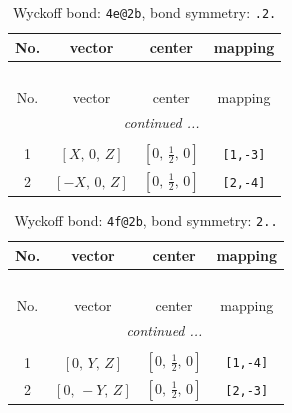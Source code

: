 \documentclass[fleqn,8pt]{jsarticle}
\begin{document}
\renewcommand{\arraystretch}{1.2}
\begin{longtable}{cccc}
\caption{Wyckoff bond: {\tt 4e@2b}, bond symmetry: {\tt .2.}}
 \\
 \hline \hline
No. & vector & center & mapping \\ \hline \endfirsthead

\multicolumn{3}{l}{\tablename\ \thetable{}} \\
 \hline \hline
No. & vector & center & mapping \\ \hline \endhead

 \hline \hline
\multicolumn{3}{r}{\footnotesize\it continued ...} \\ \endfoot

 \hline \hline
\multicolumn{3}{r}{} \\ \endlastfoot

1 & $\left[ X,\, 0,\, Z \right]$ & $\left[ 0,\, \frac{1}{2},\, 0 \right]$ & {\tt [1,-3]} \\ \hline
2 & $\left[ - X,\, 0,\, Z \right]$ & $\left[ 0,\, \frac{1}{2},\, 0 \right]$ & {\tt [2,-4]} \\
\end{longtable}
\renewcommand{\arraystretch}{1.2}
\begin{longtable}{cccc}
\caption{Wyckoff bond: {\tt 4f@2b}, bond symmetry: {\tt 2..}}
 \\
 \hline \hline
No. & vector & center & mapping \\ \hline \endfirsthead

\multicolumn{3}{l}{\tablename\ \thetable{}} \\
 \hline \hline
No. & vector & center & mapping \\ \hline \endhead

 \hline \hline
\multicolumn{3}{r}{\footnotesize\it continued ...} \\ \endfoot

 \hline \hline
\multicolumn{3}{r}{} \\ \endlastfoot

1 & $\left[ 0,\, Y,\, Z \right]$ & $\left[ 0,\, \frac{1}{2},\, 0 \right]$ & {\tt [1,-4]} \\ \hline
2 & $\left[ 0,\, - Y,\, Z \right]$ & $\left[ 0,\, \frac{1}{2},\, 0 \right]$ & {\tt [2,-3]} \\
\end{longtable}
\renewcommand{\arraystretch}{1.2}
\end{document}
